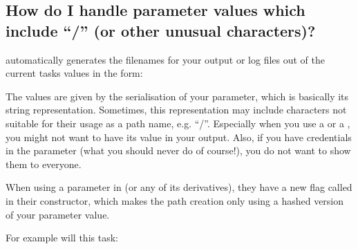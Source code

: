 \documentclass[letterpaper,10pt,english]{sphinxmanual}
\begin{document}
\begin{sphinxVerbatim}[commandchars=\\\{\}]
 
      

     
\end{sphinxVerbatim}


\subsection{How do I handle parameter values which include “/” (or other unusual characters)?}
\label{\detokenize{advanced/faq:how-do-i-handle-parameter-values-which-include-or-other-unusual-characters}}
 automatically generates the filenames for your output or log files out of
the current tasks values in the form:

\begin{sphinxVerbatim}[commandchars=\\\{\}]
\end{sphinxVerbatim}

The values are given by the serialisation of your parameter, which is basically its string representation.
Sometimes, this representation may include characters not suitable for their usage as a path name,
e.g. “/”.
Especially when you use a  or a , you might not
want to have its value in your output.
Also, if you have credentials in the parameter (what you should never do of course!), you do not
want to show them to everyone.

When using a parameter in  (or any of its derivatives), they have a new flag called 
in their constructor, which makes the path creation only using a hashed version of your parameter value.

For example will this task:
\end{document}

